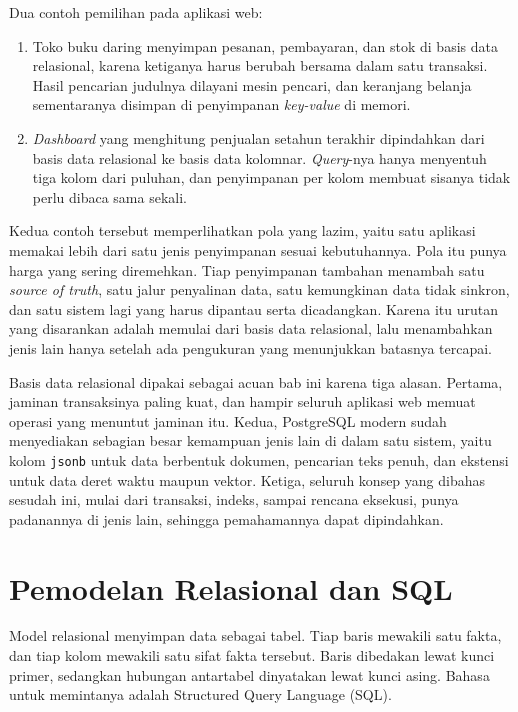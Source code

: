 Dua contoh pemilihan pada aplikasi web:

\begin{enumerate}
  \item Toko buku daring menyimpan pesanan, pembayaran, dan stok di basis data
        relasional, karena ketiganya harus berubah bersama dalam satu
        transaksi. Hasil pencarian judulnya dilayani mesin pencari, dan
        keranjang belanja sementaranya disimpan di penyimpanan \textit{key-value} di
        memori.
  \item \textit{Dashboard} yang menghitung penjualan setahun terakhir dipindahkan
        dari basis data relasional ke basis data kolomnar. \textit{Query}-nya hanya
        menyentuh tiga kolom dari puluhan, dan penyimpanan per kolom membuat
        sisanya tidak perlu dibaca sama sekali.
\end{enumerate}

Kedua contoh tersebut memperlihatkan pola yang lazim, yaitu satu aplikasi
memakai lebih dari satu jenis penyimpanan sesuai kebutuhannya. Pola itu punya
harga yang sering diremehkan. Tiap penyimpanan tambahan menambah satu \textit{source
of truth}, satu jalur penyalinan data, satu kemungkinan data tidak sinkron, dan
satu sistem lagi yang harus dipantau serta dicadangkan. Karena itu urutan yang
disarankan adalah memulai dari basis data relasional, lalu menambahkan jenis
lain hanya setelah ada pengukuran yang menunjukkan batasnya tercapai.

Basis data relasional dipakai sebagai acuan bab ini karena tiga alasan.
Pertama, jaminan transaksinya paling kuat, dan hampir seluruh aplikasi web
memuat operasi yang menuntut jaminan itu. Kedua, PostgreSQL modern sudah
menyediakan sebagian besar kemampuan jenis lain di dalam satu sistem, yaitu
kolom \texttt{jsonb} untuk data berbentuk dokumen, pencarian teks penuh, dan
ekstensi untuk data deret waktu maupun vektor. Ketiga, seluruh konsep yang
dibahas sesudah ini, mulai dari transaksi, indeks, sampai rencana eksekusi,
punya padanannya di jenis lain, sehingga pemahamannya dapat dipindahkan.

\section{Pemodelan Relasional dan SQL}

Model relasional menyimpan data sebagai tabel. Tiap baris mewakili satu fakta,
dan tiap kolom mewakili satu sifat fakta tersebut. Baris dibedakan lewat kunci
primer, sedangkan hubungan antartabel dinyatakan lewat kunci asing. Bahasa
untuk memintanya adalah Structured Query Language (SQL).

